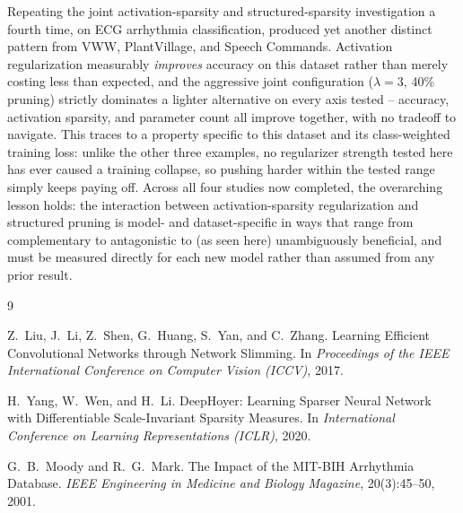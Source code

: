 \documentclass[11pt]{article}
\begin{document}
Repeating the joint activation-sparsity and structured-sparsity investigation a fourth time, on ECG arrhythmia classification, produced yet another distinct pattern from VWW, PlantVillage, and Speech Commands. Activation regularization measurably \emph{improves} accuracy on this dataset rather than merely costing less than expected, and the aggressive joint configuration ($\lambda=3$, 40\% pruning) strictly dominates a lighter alternative on every axis tested -- accuracy, activation sparsity, and parameter count all improve together, with no tradeoff to navigate. This traces to a property specific to this dataset and its class-weighted training loss: unlike the other three examples, no regularizer strength tested here has ever caused a training collapse, so pushing harder within the tested range simply keeps paying off. Across all four studies now completed, the overarching lesson holds: the interaction between activation-sparsity regularization and structured pruning is model- and dataset-specific in ways that range from complementary to antagonistic to (as seen here) unambiguously beneficial, and must be measured directly for each new model rather than assumed from any prior result.

\begin{thebibliography}{9}

Z.~Liu, J.~Li, Z.~Shen, G.~Huang, S.~Yan, and C.~Zhang.
\newblock Learning Efficient Convolutional Networks through Network Slimming.
\newblock In \emph{Proceedings of the IEEE International Conference on Computer Vision (ICCV)}, 2017.

H.~Yang, W.~Wen, and H.~Li.
\newblock DeepHoyer: Learning Sparser Neural Network with Differentiable Scale-Invariant Sparsity Measures.
\newblock In \emph{International Conference on Learning Representations (ICLR)}, 2020.

G.~B.~Moody and R.~G.~Mark.
\newblock The Impact of the MIT-BIH Arrhythmia Database.
\newblock \emph{IEEE Engineering in Medicine and Biology Magazine}, 20(3):45--50, 2001.

\end{thebibliography}
\end{document}
